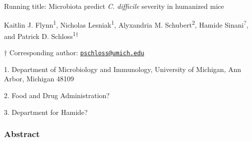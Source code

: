 \documentclass[]{article}
\title{}
\author{}
\date{}
\begin{document}
\maketitle


\vspace{35mm}

Running title: Microbiota predict \emph{C. difficile} severity in
humanized mice

\vspace{35mm}

Kaitlin J. Flynn\textsuperscript{1}, Nicholas
Lesniak\textsuperscript{1}, Alyxandria M. Schubert\textsuperscript{2},
Hamide Sinani\textsuperscript{?}, and Patrick D.
Schloss\textsuperscript{1\(\dagger\)}

\vspace{40mm}

\(\dagger\) Corresponding author:
\href{mailto:pschloss@umich.edu}{\nolinkurl{pschloss@umich.edu}}

1. Department of Microbiology and Immunology, University of Michigan,
Ann Arbor, Michigan 48109

2. Food and Drug Administration?

3. Department for Hamide?

\newpage
\linenumbers

\subsubsection{Abstract}\label{abstract}
\end{document}
